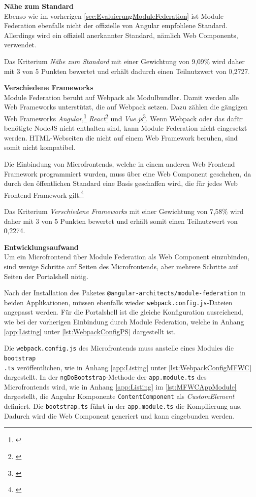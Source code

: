 \textbf{Nähe zum Standard}\\
Ebenso wie im vorherigen \cref{sec:EvaluierungModuleFederation} ist Module Federation ebenfalls nicht der offizielle von Angular empfohlene Standard. Allerdings wird ein offiziell anerkannter Standard, nämlich Web Components, verwendet.

Das Kriterium \textit{Nähe zum Standard} mit einer Gewichtung von 9,09\% wird daher mit 3 von 5 Punkten bewertet und erhält dadurch einen Teilnutzwert von 0,2727.

\textbf{Verschiedene Frameworks}\\
Module Federation beruht auf Webpack als Modulbundler. Damit werden alle Web Frameworks unterstützt, die auf Webpack setzen. Dazu zählen die gängigen Web Frameworks \textit{Angular},\footnote{\cite[vgl.][]{Steyer2020a}} \textit{React}\footnote{\cite[vgl.][]{ElHousieny2021}}  und \textit{Vue.js}\footnote{\cite[vgl.][]{Henry2021}}. Wenn Webpack oder das dafür benötigte NodeJS nicht enthalten sind, kann Module Federation nicht eingesetzt werden. \gls{HTML}-Webseiten die nicht auf einem Web Framework beruhen, sind somit nicht kompatibel.

Die Einbindung von Microfrontends, welche in einem anderen Web Frontend Framework programmiert wurden, muss über eine Web Component geschehen, da durch den öffentlichen Standard eine Basis geschaffen wird, die für jedes Web Frontend Framework gilt.\footnote{\cite[vgl.][]{Steyer2020a}}

Das Kriterium \textit{Verschiedene Frameworks} mit einer Gewichtung von 7,58\% wird daher mit 3 von 5 Punkten bewertet und erhält somit einen Teilnutzwert von 0,2274.

\textbf{Entwicklungsaufwand}\\
Um ein Microfrontend über Module Federation als Web Component einzubinden, sind wenige Schritte auf Seiten des Microfrontends, aber mehrere Schritte auf Seiten der Portalshell nötig.

Nach der Installation des Paketes \texttt{@angular-architects/module-federation} in beiden Applikationen, müssen ebenfalls wieder \texttt{webpack.config.js}-Dateien angepasst werden. Für die Portalshell ist die gleiche Konfiguration ausreichend, wie bei der vorherigen Einbindung durch Module Federation, welche in Anhang \ref{app:Listing} unter \cref{lst:WebpackConfigPS} dargestellt ist.

Die \texttt{webpack.config.js} des Microfrontends muss anstelle eines Modules die \texttt{bootstrap\\.ts} veröffentlichen, wie in Anhang \ref{app:Listing} unter \cref{lst:WebpackConfigMFWC} dargestellt. In der \texttt{ngDoBootstrap}-Methode der \texttt{app.module.ts} des Microfrontends wird, wie in Anhang \ref{app:Listing} im \cref{lst:MFWCAppModule} dargestellt, die Angular Komponente \texttt{ContentComponent} als \textit{CustomElement} definiert. Die \texttt{bootstrap.ts} führt in der \texttt{app.module.ts} die Kompilierung aus. Dadurch wird die Web Component generiert und kann eingebunden werden.


